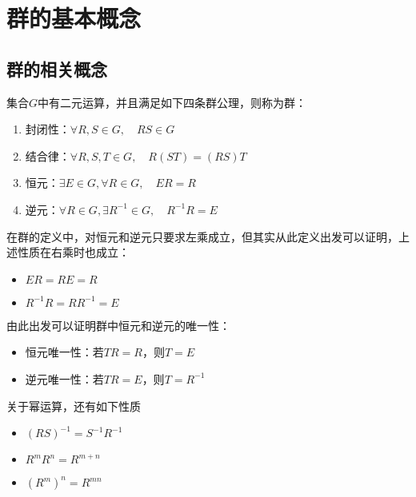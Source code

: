\chapter{群的基本概念}
\section{群的相关概念}
\begin{definition}[群]
    集合$G$中有二元运算，并且满足如下四条群公理，则称为群：
    \begin{enumerate}
        \item 封闭性：$\forall R,S\in G,\quad RS\in G$
        \item 结合律：$\forall R,S,T\in G,\quad R(ST)=(RS)T$
        \item 恒元：$\exists E\in G,\forall R\in G,\quad ER=R$
        \item 逆元：$\forall R\in G,\exists R^{-1}\in G,\quad R^{-1}R=E$
    \end{enumerate}
\end{definition}
在群的定义中，对恒元和逆元只要求左乘成立，但其实从此定义出发可以证明，上述性质在右乘时也成立：
\begin{property}[恒元和逆元的右乘]
    \indent
    \begin{itemize}
        \item $ER=RE=R$
        \item $R^{-1}R=RR^{-1}=E$
    \end{itemize}
\end{property}
由此出发可以证明群中恒元和逆元的唯一性：
\begin{property}[恒元和逆元的唯一性]
    \indent
    \begin{itemize}
        \item 恒元唯一性：若$TR=R$，则$T=E$
        \item 逆元唯一性：若$TR=E$，则$T=R^{-1}$
    \end{itemize}
\end{property}
关于幂运算，还有如下性质
\begin{property}[幂运算]
    \indent
    \begin{itemize}
        \item $(RS)^{-1}=S^{-1}R^{-1}$
        \item $R^mR^n=R^{m+n}$
        \item $(R^m)^n=R^{mn}$
    \end{itemize}
\end{property}
